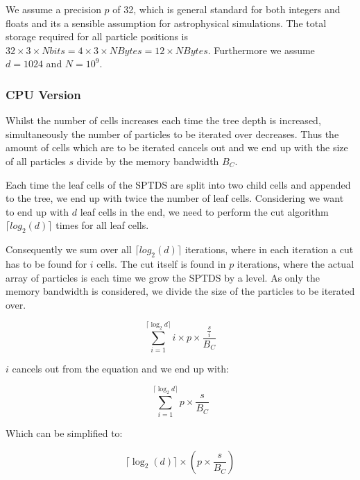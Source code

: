 \documentclass[]{article}
\begin{document}
We assume a precision $p$ of 32, which is general standard for both integers and floats and its a sensible assumption for astrophysical simulations. The total storage required for all particle positions is $32 \times 3 \times N bits = 4 \times 3 \times N Bytes = 12 \times N Bytes$. Furthermore we assume $d = 1024$ and $N=10^9$.
 
\subsubsection{CPU Version}


Whilst the number of cells increases each time the tree depth is increased, simultaneously the number of particles to be iterated over decreases. Thus the amount of cells which are to be iterated cancels out and we end up with the size of all particles $s$ divide by the memory bandwidth $B_C$.  


Each time the leaf cells of the SPTDS are split into two child cells and appended to the tree, we end up with twice the number of leaf cells. Considering we want to end up with $d$ leaf cells in the end, we need to perform the cut algorithm $\lceil log_2(d) \rceil$ times for all leaf cells. 

Consequently we sum over all $\lceil log_2(d) \rceil$ iterations, where in each iteration a cut has to be found for $i$ cells. The cut itself is found in $p$ iterations, where the actual array of particles is each time we grow the SPTDS by a level. As only the memory bandwidth is considered, we divide the size of the particles to be iterated over.

\begin{center}
	\begin{equation}
		\sum_{i=1}^{\lceil \log_2{d} \rceil} i \times p \times  \frac{ \frac{s}{i}}{B_C} 
		\label{eq:cpu1}
	\end{equation}
\end{center}

$i$ cancels out from the equation and we end up with:

\begin{center}
	\begin{equation}
		\sum_{i=1}^{\lceil \log_2{d} \rceil} p \times \frac{s}{B_C} 
		\label{eq:cpu2}
	\end{equation}
\end{center}

Which can be simplified to:

\begin{center}
	\begin{equation}
		\lceil \log_2(d) \rceil  \times \left ( p \times \frac{ s }{B_{C}} \right )
		\label{eq:cpu}
	\end{equation}
\end{center}
\end{document}
